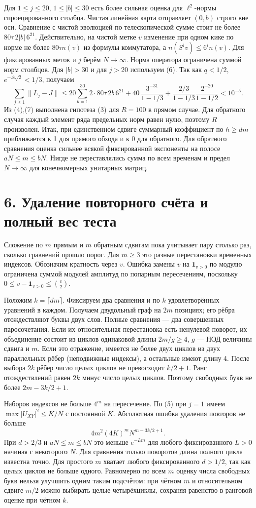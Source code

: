 \documentclass[11pt,a4paper]{article}
\newcommand{\sect}[1]{\section*{\sffamily\color{ink}#1}}
\begin{document}
Для $1\le j\le20$, $1\le|b|\le30$ есть более сильная оценка для $\ell^2$-нормы спроецированного столбца. Чистая линейная карта отправляет $(0,b)$ строго вне оси. Сравнение с чистой эволюцией по телескопической сумме стоит не более $80\tau\,2|b|\,6^{21}$. Действительно, на чистой метке $v$ изменение при одном кике по норме не более $80\tau n(v)$ из формулы коммутатора, а $n(S^iv)\le6^in(v)$. Для фиксированных меток и $j$ берём $N\to\infty$. Норма оператора ограничена суммой норм столбцов. Для $|b|>30$ и для $j>20$ используем (6). Так как $q<1/2$, $e^{-.8\sqrt2}<1/3$, получаем
\[
 \sum_{j\ge1}\|L_j-J\|\le
 20\sum_{b=1}^{30}2\cdot80\tau\,2b\,6^{21}
 +40\,\frac{3^{-31}}{1-1/3}
 +\frac{2/3}{1-1/3}\frac{2^{-20}}{1-1/2}<10^{-5}.                        \tag{7}
\]
Из (4),(7) выполнена гипотеза (3) для $R=100$ в прямом случае. Для обратного случая каждый элемент ряда предельных норм равен нулю, поэтому $R$ произволен. Итак, при единственном сдвиге суммарный коэффициент по $h\ge dm$ приближается к 1 для прямого обхода и к 0 для обратного. Для обратного сравнения оценка сильнее всякой фиксированной экспоненты на полосе $aN\le m\le bN$. Нигде не переставлялись сумма по всем временам и предел $N\to\infty$ для конечномерных унитарных матриц.
\newpage
\sect{6. Удаление повторного счёта и полный вес теста}
Сложение по $m$ прямым и $m$ обратным сдвигам пока учитывает пару столько раз, сколько сравнений прошло порог. Для $m\ge3$ это разные перестановки временных индексов. Обозначим кратность через $v$. Ошибка замены $v$ на $\mathbf1_{v>0}$ по модулю ограничена суммой модулей амплитуд по попарным пересечениям, поскольку $0\le v-\mathbf1_{v>0}\le\binom v2$.

Положим $k=\lceil dm\rceil$. Фиксируем два сравнения и по $k$ удовлетворённых уравнений в каждом. Получаем двудольный граф на $2m$ позициях; его рёбра отождествляют буквы двух слов. Полные сравнения --- два совершенных паросочетания. Если их относительная перестановка есть ненулевой поворот, их объединение состоит из циклов одинаковой длины $2m/g\ge4$, $g$ --- НОД величины сдвига и $m$. Если это отражение, имеется не более двух циклов из двух параллельных рёбер (неподвижные индексы), а остальные имеют длину 4. После выбора $2k$ рёбер число целых циклов не превосходит $k/2+1$. Ранг отождествлений равен $2k$ минус число целых циклов. Поэтому свободных букв не более $2m-3k/2+1$.

Наборов индексов не больше $4^m$ на пересечение. По (5) при $j=1$ имеем $\max|U_{XY}|^2\le K/N$ с постоянной $K$. Абсолютная ошибка удаления повторов не больше
\[
             4m^2(4K)^m N^{m-3k/2+1}.                                      \tag{8}
\]
При $d>2/3$ и $aN\le m\le bN$ это меньше $e^{-L m}$ для любого фиксированного $L>0$ начиная с некоторого $N$. Для сравнения только поворотов длина полного цикла известна точно. Для простого $m$ хватает любого фиксированного $d>1/2$, так как целых циклов не больше одного. Равномерно по всем $m$ оценку числа свободных букв нельзя улучшить одним таким подсчётом: при чётном $m$ и относительном сдвиге $m/2$ можно выбирать целые четырёхциклы, сохраняя равенство в ранговой оценке при чётном $k$.
\end{document}
